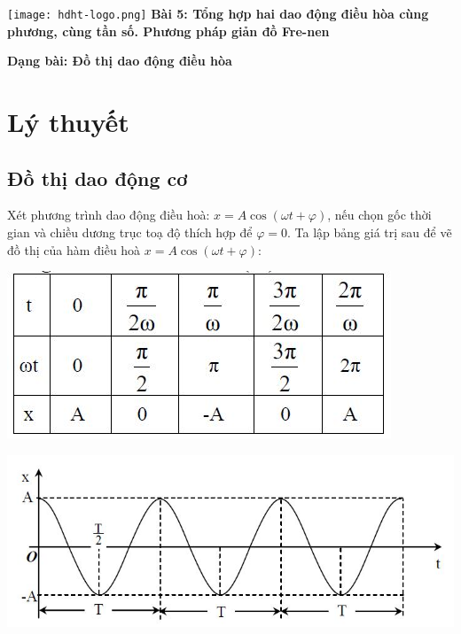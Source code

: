 \newcommand{\chapter}[2][]{
	\newcommand{\chapname}{#2}
	\begin{flushleft}
		\begin{minipage}[t]{\linewidth}
			\texttt{[image: hdht-logo.png]}
			\hspace{0pt}	
			\sffamily\bfseries\large Bài 5: Tổng hợp hai dao động điều hòa cùng phương,
			cùng tần số. Phương pháp giản đồ Fre-nen
			\begin{flushleft}
				\huge\bfseries #1
			\end{flushleft}
		\end{minipage}
	\end{flushleft}
	\vspace{1cm}
	\normalfont\normalsize
}
\chapter[Dạng bài: Đồ thị dao động điều hòa]{Dạng bài: Đồ thị dao động điều hòa}
\section{Lý thuyết}
\subsection{Đồ thị dao động cơ}
Xét phương trình dao động điều hoà: $x = A \cos(\omega t+\varphi)$, nếu chọn gốc thời gian và chiều dương trục toạ độ thích hợp để $\varphi = 0$. Ta lập bảng giá trị sau để vẽ đồ thị của hàm điều hoà $x = A \cos(\omega t+\varphi)$:
\begin{center}
	\includegraphics[scale=0.7]{../figs/VN12-PH-06-A-004-2-V2-02.jpg}
\end{center}
\begin{center}
	\includegraphics[scale=0.6]{../figs/VN12-PH-06-A-004-2-V2-01.jpg}
\end{center}
